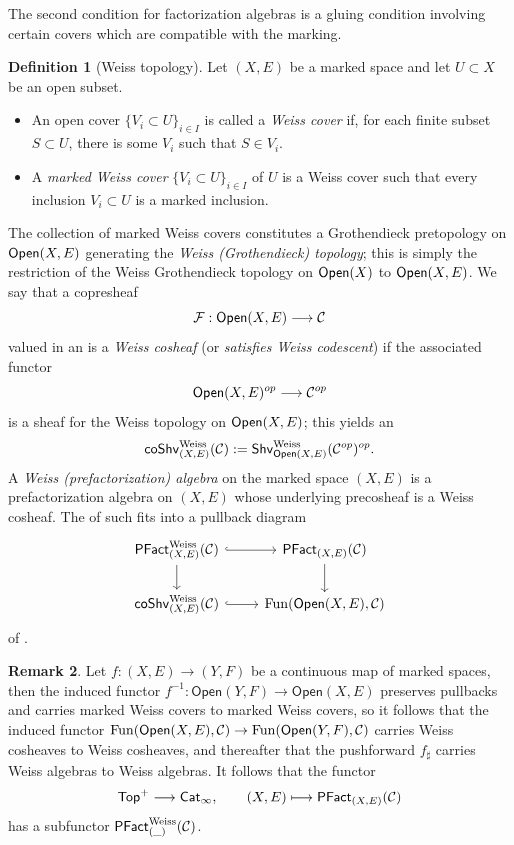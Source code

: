 \documentclass[10pt, reqno, twoside
, final
]{amsart}
\numberwithin{equation}{subsection}%
\theoremstyle{definition}
\newtheorem{defn}{Definition}[subsection]
\theoremstyle{definition}
\theoremstyle{definition}
\theoremstyle{definition}
\theoremstyle{definition}
\theoremstyle{definition}
\theoremstyle{definition}
\theoremstyle{definition}
\theoremstyle{definition}
\theoremstyle{plain}
\theoremstyle{definition}
\theoremstyle{plain}
\theoremstyle{definition}
\theoremstyle{plain}
\theoremstyle{definition}
\newtheorem{rmk}[defn]{Remark}
\theoremstyle{definition}
\theoremstyle{plain}
\theoremstyle{plain}
\theoremstyle{definition}
\theoremstyle{plain}
\theoremstyle{plain}
\theoremstyle{plain}
\begin{document}
The second condition for factorization algebras is a gluing condition involving certain covers which are compatible with the marking.
\begin{defn}[Weiss topology]
Let $(X,E)$ be a marked space and let $U\subset X$ be an open subset.
\begin{itemize}
	\item An open cover $\{V_i\subset U\}_{i\in I}$ is called a \emph{Weiss cover} if, for each finite subset $S\subset U$, there is some $V_i$ such that $S\in V_i$.
	\item A \emph{marked Weiss cover} $\{V_i\subset U\}_{i\in I}$ of \(U\) is a Weiss cover such that every inclusion $V_i\subset U$ is a marked inclusion. 
\end{itemize}
The collection of marked Weiss covers constitutes a Grothendieck pretopology on $\mathsf{Open}(X,E)$ generating the \emph{Weiss (Grothendieck) topology}; this is simply the restriction of the Weiss Grothendieck topology on $\mathsf{Open}(X)$ to $\mathsf{Open}(X,E)$. We say that a copresheaf 
\[ \mathcal{F}:\mathsf{Open}(X,E)\longrightarrow \mathcal{C} \]
valued in an \infcat is a \emph{Weiss cosheaf} (or \emph{satisfies  Weiss codescent}) if the associated functor
\[ \mathsf{Open}(X,E)^{op}\longrightarrow \mathcal{C}^{op}   \]
is a sheaf for the Weiss topology on $\mathsf{Open}(X,E)$; this yields an \infcat 
\[\mathsf{coShv}^{\mathrm{Weiss}}_{(X,E)}(\mathcal{C}):=\mathsf{Shv}^{\mathrm{Weiss}}_{\mathsf{Open}(X,E)}(\mathcal{C}^{op})^{op}.\]
A \emph{Weiss (prefactorization) algebra} on the marked space $(X,E)$ is a prefactorization algebra on $(X,E)$ whose underlying precosheaf is a Weiss cosheaf. The \infcat of such fits into a pullback diagram 
\[
\begin{tikzcd}
    \pfact^{\mathrm{Weiss}}_{(X,E)}(\icat) \ar[d] \ar[r,hook] &\pfact_{(X,E)}(\icat) \ar[d] \\
    \mathsf{coShv}^{\mathrm{Weiss}}_{(X,E)}(\icat) \ar[r,hook] & \fun(\mathsf{Open}(X,E),\icat) 
\end{tikzcd}
\]
of \infcatst.
\end{defn}
\begin{rmk}\label{rmk:pushfwdweiss}
Let $f:(X,E)\rightarrow (Y,F)$ be a continuous map of marked spaces, then the induced functor $f^{-1}:\mathsf{Open}(Y,F)\rightarrow \mathsf{Open}(X,E)$ preserves pullbacks and carries marked Weiss covers to marked Weiss covers, so it follows that the induced functor $\mathrm{Fun}(\mathsf{Open}(X,E),\mathcal{C})\rightarrow \mathrm{Fun}(\mathsf{Open}(Y,F),\mathcal{C})$ carries Weiss cosheaves to Weiss cosheaves, and thereafter that the pushforward $f_{\sharp}$ carries Weiss algebras to Weiss algebras. It follows that the functor 
\[ \mathsf{Top}^+\longrightarrow \mathsf{Cat}_{\infty},\quad\quad (X,E)\longmapsto \mathsf{PFact}_{(X,E)}(\mathcal{C})  \]
has a subfunctor $\mathsf{PFact}^{\mathrm{Weiss}}_{(\_)}(\mathcal{C})$.
\end{rmk}
\end{document}
